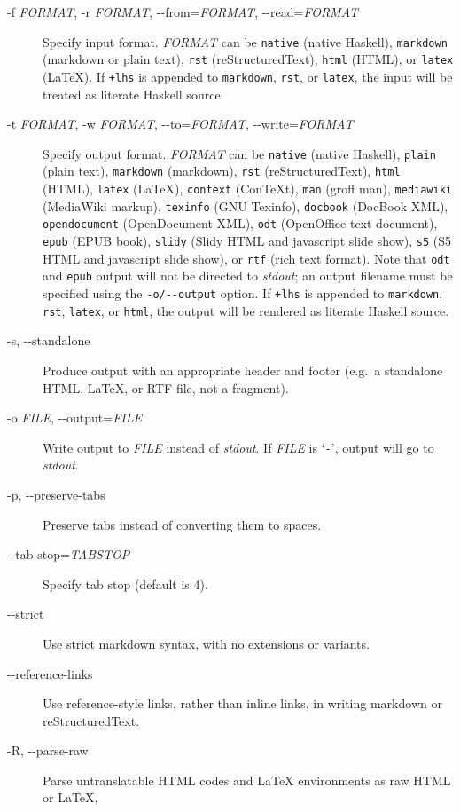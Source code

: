 \documentclass[
  12pt,
  a4paper,
]{article}
\begin{document}
\begin{description}
\item[-f \emph{FORMAT}, -r \emph{FORMAT}, -\/-from=\emph{FORMAT},
-\/-read=\emph{FORMAT}]
Specify input format. \emph{FORMAT} can be \texttt{native} (native Haskell),
\texttt{markdown} (markdown or plain text), \texttt{rst} (reStructuredText),
\texttt{html} (HTML), or \texttt{latex} (LaTeX). If \texttt{+lhs} is appended
to \texttt{markdown}, \texttt{rst}, or \texttt{latex}, the input will be
treated as literate Haskell source.
\item[-t \emph{FORMAT}, -w \emph{FORMAT}, -\/-to=\emph{FORMAT},
-\/-write=\emph{FORMAT}]
Specify output format. \emph{FORMAT} can be \texttt{native} (native Haskell),
\texttt{plain} (plain text), \texttt{markdown} (markdown), \texttt{rst}
(reStructuredText), \texttt{html} (HTML), \texttt{latex} (LaTeX),
\texttt{context} (ConTeXt), \texttt{man} (groff man), \texttt{mediawiki}
(MediaWiki markup), \texttt{texinfo} (GNU Texinfo), \texttt{docbook} (DocBook
XML), \texttt{opendocument} (OpenDocument XML), \texttt{odt} (OpenOffice text
document), \texttt{epub} (EPUB book), \texttt{slidy} (Slidy HTML and
javascript slide show), \texttt{s5} (S5 HTML and javascript slide show), or
\texttt{rtf} (rich text format). Note that \texttt{odt} and \texttt{epub}
output will not be directed to \emph{stdout}; an output filename must be
specified using the \texttt{-o/-\/-output} option. If \texttt{+lhs} is
appended to \texttt{markdown}, \texttt{rst}, \texttt{latex}, or \texttt{html},
the output will be rendered as literate Haskell source.
\item[-s, -\/-standalone]
Produce output with an appropriate header and footer (e.g.~a standalone HTML,
LaTeX, or RTF file, not a fragment).
\item[-o \emph{FILE}, -\/-output=\emph{FILE}]
Write output to \emph{FILE} instead of \emph{stdout}. If \emph{FILE} is
`\texttt{-}', output will go to \emph{stdout}.
\item[-p, -\/-preserve-tabs]
Preserve tabs instead of converting them to spaces.
\item[-\/-tab-stop=\emph{TABSTOP}]
Specify tab stop (default is 4).
\item[-\/-strict]
Use strict markdown syntax, with no extensions or variants.
\item[-\/-reference-links]
Use reference-style links, rather than inline links, in writing markdown or
reStructuredText.
\item[-R, -\/-parse-raw]
Parse untranslatable HTML codes and LaTeX environments as raw HTML or LaTeX,

\end{description}
\end{document}
